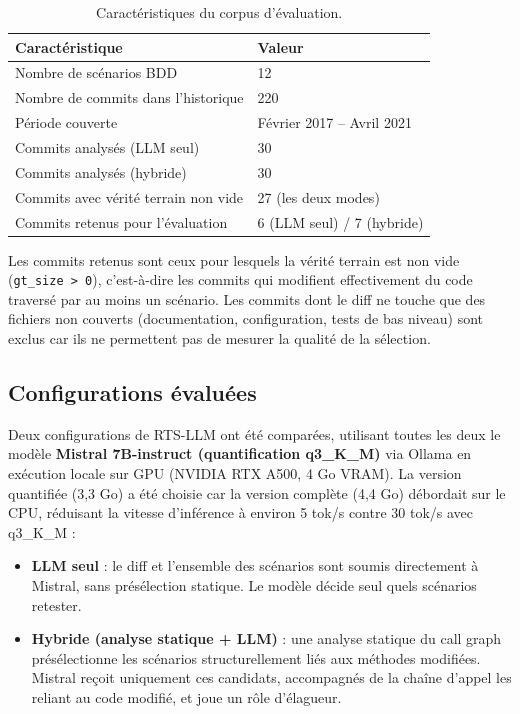\documentclass[12pt,a4paper]{article}
\begin{document}
\begin{table}[H]
\centering
\begin{tabular}{ll}
\toprule
\textbf{Caractéristique}              & \textbf{Valeur} \\
\midrule
Nombre de scénarios BDD               & 12 \\
Nombre de commits dans l'historique   & 220 \\
Période couverte                      & Février 2017 -- Avril 2021 \\
Commits analysés (LLM seul)           & 30 \\
Commits analysés (hybride)            & 30 \\
Commits avec vérité terrain non vide  & 27 (les deux modes) \\
Commits retenus pour l'évaluation     & 6 (LLM seul) / 7 (hybride) \\
\bottomrule
\end{tabular}
\caption{Caractéristiques du corpus d'évaluation.}
\label{tab:corpus}
\end{table}

\noindent Les commits retenus sont ceux pour lesquels la vérité terrain
est non vide (\texttt{gt\_size > 0}), c'est-à-dire les commits qui
modifient effectivement du code traversé par au moins un scénario.
Les commits dont le diff ne touche que des fichiers non couverts
(documentation, configuration, tests de bas niveau) sont exclus car
ils ne permettent pas de mesurer la qualité de la sélection.

\subsection{Configurations évaluées}

Deux configurations de RTS-LLM ont été comparées, utilisant toutes les
deux le modèle \textbf{Mistral 7B-instruct (quantification q3\_K\_M)}
via Ollama en exécution locale sur GPU (NVIDIA RTX A500, 4 Go VRAM).
La version quantifiée (3,3 Go) a été choisie car la version complète
(4,4 Go) débordait sur le CPU, réduisant la vitesse d'inférence à
environ 5 tok/s contre 30 tok/s avec q3\_K\_M :

\begin{itemize}
  \item \textbf{LLM seul} : le diff et l'ensemble des scénarios sont
        soumis directement à Mistral, sans présélection statique.
        Le modèle décide seul quels scénarios retester.

  \item \textbf{Hybride (analyse statique + LLM)} : une analyse statique
        du call graph présélectionne les scénarios structurellement liés
        aux méthodes modifiées. Mistral reçoit uniquement ces candidats,
        accompagnés de la chaîne d'appel les reliant au code modifié,
        et joue un rôle d'élagueur.
\end{itemize}
\end{document}
